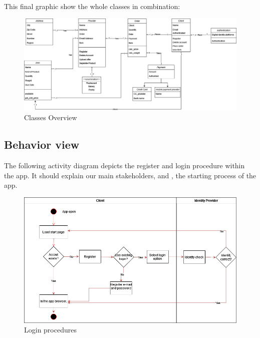 \newpage
\thispagestyle{lscape}
\begin{landscape}

This final graphic show the whole classes in combination:

\begin{figure}[H]
    \centering
    \includegraphics[width=1.5\textwidth]{assets/classes_CD.jpg}
    \caption{Classes Overview}
    \label{fig:class_CD}
\end{figure}

\end{landscape}



\subsection{Behavior view}

The following \gls{activity diagram} depicts the register and login procedure within the app. It should explain our
main stakeholders,  and , the starting process of the app.

\begin{figure}[H]
    \centering
    \includegraphics[width=1\textwidth]{assets/login_AC.jpg}
    \caption{Login procedures}
    \label{fig:login_register}
\end{figure}



